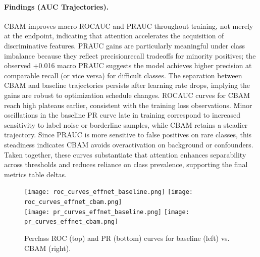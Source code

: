 \paragraph{Findings (AUC Trajectories).}
CBAM improves macro ROC\textendash AUC and PR\textendash AUC throughout training, not merely at the endpoint, indicating that attention accelerates the acquisition of discriminative features. PR\textendash AUC gains are particularly meaningful under class imbalance because they reflect precision\textendash recall trade\textendash offs for minority positives; the observed +0.016 macro PR\textendash AUC suggests the model achieves higher precision at comparable recall (or vice versa) for difficult classes. The separation between CBAM and baseline trajectories persists after learning rate drops, implying the gains are robust to optimization schedule changes. ROC\textendash AUC curves for CBAM reach high plateaus earlier, consistent with the training loss observations. Minor oscillations in the baseline PR curve late in training correspond to increased sensitivity to label noise or borderline samples, while CBAM retains a steadier trajectory. Since PR\textendash AUC is more sensitive to false positives on rare classes, this steadiness indicates CBAM avoids over\textendash activation on background or confounders. Taken together, these curves substantiate that attention enhances separability across thresholds and reduces reliance on class prevalence, supporting the final metrics table deltas.

\begin{figure}[H]
  \centering
  \texttt{[image: roc\_curves\_effnet\_baseline.png]}
  \texttt{[image: roc\_curves\_effnet\_cbam.png]}\\
  \texttt{[image: pr\_curves\_effnet\_baseline.png]}
  \texttt{[image: pr\_curves\_effnet\_cbam.png]}
  \caption{Per\textendash class ROC (top) and PR (bottom) curves for baseline (left) vs. CBAM (right).}
  \label{fig:perclass_curves}
\end{figure}

